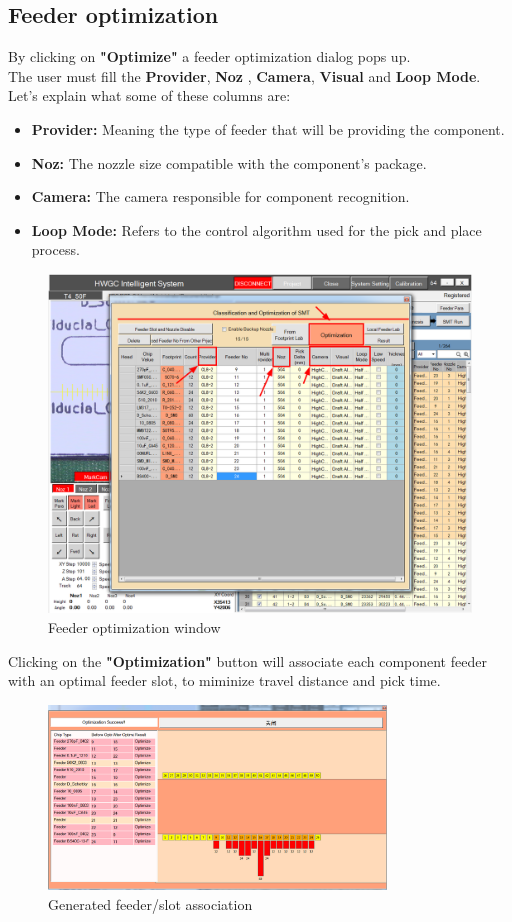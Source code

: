 \documentclass[a4paper,10pt]{report}
\begin{document}
\subsection{Feeder optimization}
By clicking on \textbf{"Optimize"} a feeder optimization dialog pops up.\\
The user must fill the \textbf{Provider}, \textbf{Noz} , \textbf{Camera}, \textbf{Visual} and \textbf{Loop Mode}. Let's explain what some of these columns are:
\begin{itemize}
 \item \textbf{Provider: } Meaning the type of feeder that will be providing the component.
 \item \textbf{Noz: } The nozzle size compatible with the component's package.
 \item \textbf{Camera: } The camera responsible for component recognition.
 \item \textbf{Loop Mode: } Refers to the control algorithm used for the pick and place process.
\end{itemize}
\begin{figure}[!htb]
 \centering
 \includegraphics[width=1\textwidth]{images/scrot18.png}
 \caption{Feeder optimization window}
\end{figure}
Clicking on the \textbf{"Optimization"} button will associate each component feeder with an optimal feeder slot, to miminize travel distance and pick time.
\newpage
\begin{figure}[!htb]
 \centering
 \includegraphics[width=0.8\textwidth]{images/scrot19.png}
 \caption{Generated feeder/slot association}
\end{figure}
\end{document}
